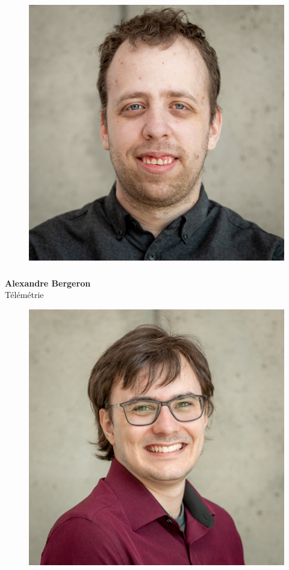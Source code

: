 \documentclass[a0paper,portrait]{baposter}
\begin{document}
\begin{poster}
{%
\begin{figure}
\includegraphics[width=0.9\linewidth]{img/membres/Alexandre-Bergeron-2.jpg} 
\end{figure}
\subsubsection*{}
\vspace{2mm}
\textbf{Alexandre Bergeron}\\
Télémétrie

\begin{figure}
\includegraphics[width=.9\linewidth]{img/membres/Malik-Claveau-2.jpg} 
\end{figure}
}
\end{poster}
\end{document}
